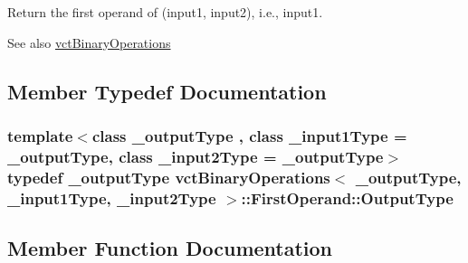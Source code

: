 Return the first operand of (input1, input2), i.\+e., input1. 

\begin{DoxySeeAlso}{See also}
\hyperlink{classvct_binary_operations}{vct\+Binary\+Operations} 
\end{DoxySeeAlso}


\subsection{Member Typedef Documentation}
\hypertarget{classvct_binary_operations_1_1_first_operand_a236847584897a5c19908da9440b730f2}{}
\subsubsection[{Output\+Type}]{\setlength{\rightskip}{0pt plus 5cm}template$<$class \+\_\+output\+Type , class \+\_\+input1\+Type  = \+\_\+output\+Type, class \+\_\+input2\+Type  = \+\_\+output\+Type$>$ typedef \+\_\+output\+Type {\bf vct\+Binary\+Operations}$<$ \+\_\+output\+Type, \+\_\+input1\+Type, \+\_\+input2\+Type $>$\+::{\bf First\+Operand\+::\+Output\+Type}}\label{classvct_binary_operations_1_1_first_operand_a236847584897a5c19908da9440b730f2}


\subsection{Member Function Documentation}
\hypertarget{classvct_binary_operations_1_1_first_operand_aa777aaab3df319d47dcbc67c95d4d5e5}{}
